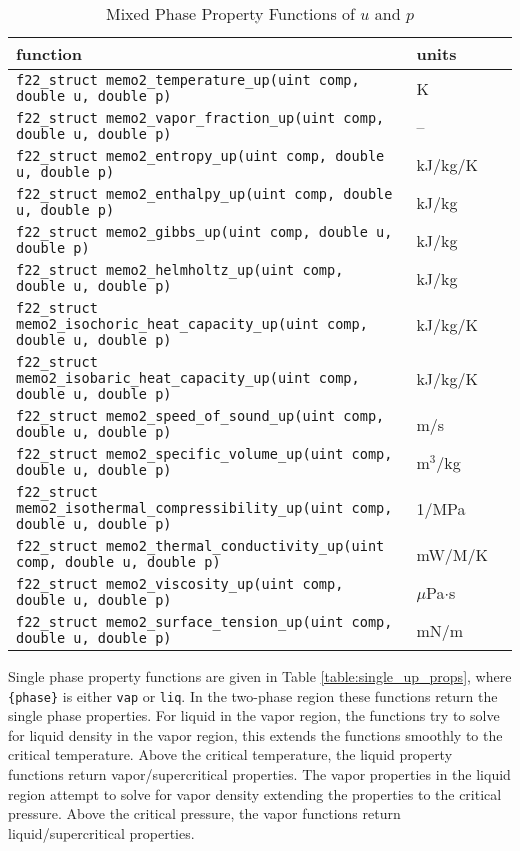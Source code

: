\documentclass[oneside]{book}
\begin{document}
\begin{table}[h!]
\centering
\caption{Mixed Phase Property Functions of $u$ and $p$}
\begin{tabular}{ l l l }
\hline
function & units \\
\hline
\hline
\texttt{f22\_struct memo2\_temperature\_up(uint comp, double u, double p)} & K  \\ [1ex]
\texttt{f22\_struct memo2\_vapor\_fraction\_up(uint comp, double u, double p)} & -- \\ [1ex]
\texttt{f22\_struct memo2\_entropy\_up(uint comp, double u, double p)} &  kJ/kg/K \\ [1ex]
\texttt{f22\_struct memo2\_enthalpy\_up(uint comp, double u, double p)} &  kJ/kg \\ [1ex]
\texttt{f22\_struct memo2\_gibbs\_up(uint comp, double u, double p)} &  kJ/kg \\ [1ex]
\texttt{f22\_struct memo2\_helmholtz\_up(uint comp, double u, double p)} &  kJ/kg \\ [1ex]
\texttt{f22\_struct memo2\_isochoric\_heat\_capacity\_up(uint comp, double u, double p)} &  kJ/kg/K \\ [1ex]
\texttt{f22\_struct memo2\_isobaric\_heat\_capacity\_up(uint comp, double u, double p)} &  kJ/kg/K \\ [1ex]
\texttt{f22\_struct memo2\_speed\_of\_sound\_up(uint comp, double u, double p)} &  m/s \\ [1ex]
\texttt{f22\_struct memo2\_specific\_volume\_up(uint comp, double u, double p)} &  m$^3$/kg \\ [1ex]
\texttt{f22\_struct memo2\_isothermal\_compressibility\_up(uint comp, double u, double p)} &  1/MPa \\ [1ex]
\texttt{f22\_struct memo2\_thermal\_conductivity\_up(uint comp, double u, double p)} &  mW/M/K \\ [1ex]
\texttt{f22\_struct memo2\_viscosity\_up(uint comp, double u, double p)} &  $\mu$Pa$\cdot$s \\ [1ex]
\texttt{f22\_struct memo2\_surface\_tension\_up(uint comp, double u, double p)} &  mN/m \\ [1ex]
\hline    
\end{tabular}
\label{table:mix_up_props}
\end{table}

Single phase property functions are given in Table \ref{table:single_up_props}, where \texttt{\{phase\}} is either \texttt{vap} or \texttt{liq}. In the two-phase region these functions return the single phase properties. For liquid in the vapor region, the functions try to solve for liquid density in the vapor region, this extends the functions smoothly to the critical temperature.  Above the critical temperature, the liquid property functions return vapor/supercritical properties. The vapor properties in the liquid region attempt to solve for vapor density extending the properties to the critical pressure. Above the critical pressure, the vapor functions return liquid/supercritical properties.
\end{document}
